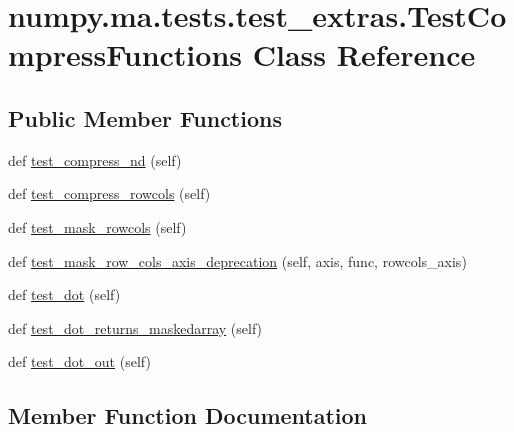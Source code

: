 \hypertarget{classnumpy_1_1ma_1_1tests_1_1test__extras_1_1TestCompressFunctions}{}\section{numpy.\+ma.\+tests.\+test\+\_\+extras.\+Test\+Compress\+Functions Class Reference}
\label{classnumpy_1_1ma_1_1tests_1_1test__extras_1_1TestCompressFunctions}
\subsection*{Public Member Functions}
\begin{DoxyCompactItemize}
\item 
def \hyperlink{classnumpy_1_1ma_1_1tests_1_1test__extras_1_1TestCompressFunctions_a8fc8b7266451ecdc2b35007929a39713}{test\+\_\+compress\+\_\+nd} (self)
\item 
def \hyperlink{classnumpy_1_1ma_1_1tests_1_1test__extras_1_1TestCompressFunctions_ab9279c3b2474c9305b03b5b011ee929b}{test\+\_\+compress\+\_\+rowcols} (self)
\item 
def \hyperlink{classnumpy_1_1ma_1_1tests_1_1test__extras_1_1TestCompressFunctions_a10b70c86d4fe26bef0dafdae581a50d4}{test\+\_\+mask\+\_\+rowcols} (self)
\item 
def \hyperlink{classnumpy_1_1ma_1_1tests_1_1test__extras_1_1TestCompressFunctions_a7b7c211696a875c99ec820bf2b0be368}{test\+\_\+mask\+\_\+row\+\_\+cols\+\_\+axis\+\_\+deprecation} (self, axis, func, rowcols\+\_\+axis)
\item 
def \hyperlink{classnumpy_1_1ma_1_1tests_1_1test__extras_1_1TestCompressFunctions_a7600fc1a47c2ba6eb2c20797078d1380}{test\+\_\+dot} (self)
\item 
def \hyperlink{classnumpy_1_1ma_1_1tests_1_1test__extras_1_1TestCompressFunctions_a0a73fe1dc05bac1f34acc8c94b17749e}{test\+\_\+dot\+\_\+returns\+\_\+maskedarray} (self)
\item 
def \hyperlink{classnumpy_1_1ma_1_1tests_1_1test__extras_1_1TestCompressFunctions_ac1002c3f7853f5dab5ad970a325a0a1c}{test\+\_\+dot\+\_\+out} (self)
\end{DoxyCompactItemize}


\subsection{Member Function Documentation}
\mbox{\label{classnumpy_1_1ma_1_1tests_1_1test__extras_1_1TestCompressFunctions_a8fc8b7266451ecdc2b35007929a39713}} 
